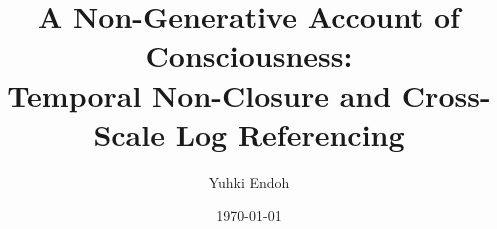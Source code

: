 \documentclass[11pt,a4paper]{article}
\title{A Non-Generative Account of Consciousness:\\{\large Temporal Non-Closure and Cross-Scale Log Referencing}}
\author{Yuhki Endoh}
\date{\today}
\begin{document}
\maketitle

\begin{abstract}

\end{abstract}

\setcounter{tocdepth}{1}
\tableofcontents
\clearpage











































\end{document}

